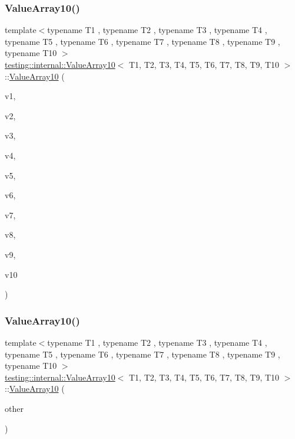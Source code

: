 \subsubsection{\texorpdfstring{ValueArray10()}{ValueArray10()}\hspace{0.1cm}{\footnotesize\ttfamily [1/2]}}
{\footnotesize\ttfamily template$<$typename T1 , typename T2 , typename T3 , typename T4 , typename T5 , typename T6 , typename T7 , typename T8 , typename T9 , typename T10 $>$ \\
\mbox{\hyperlink{classtesting_1_1internal_1_1_value_array10}{testing\+::internal\+::\+Value\+Array10}}$<$ T1, T2, T3, T4, T5, T6, T7, T8, T9, T10 $>$\+::\mbox{\hyperlink{classtesting_1_1internal_1_1_value_array10}{Value\+Array10}} (\begin{DoxyParamCaption}\item[{T1}]{v1,  }\item[{T2}]{v2,  }\item[{T3}]{v3,  }\item[{T4}]{v4,  }\item[{T5}]{v5,  }\item[{T6}]{v6,  }\item[{T7}]{v7,  }\item[{T8}]{v8,  }\item[{T9}]{v9,  }\item[{T10}]{v10 }\end{DoxyParamCaption})\hspace{0.3cm}{\ttfamily [inline]}}

\mbox{\label{classtesting_1_1internal_1_1_value_array10_a05195c20e50321e51b2502c71c5ec8fa}} 
\subsubsection{\texorpdfstring{ValueArray10()}{ValueArray10()}\hspace{0.1cm}{\footnotesize\ttfamily [2/2]}}
{\footnotesize\ttfamily template$<$typename T1 , typename T2 , typename T3 , typename T4 , typename T5 , typename T6 , typename T7 , typename T8 , typename T9 , typename T10 $>$ \\
\mbox{\hyperlink{classtesting_1_1internal_1_1_value_array10}{testing\+::internal\+::\+Value\+Array10}}$<$ T1, T2, T3, T4, T5, T6, T7, T8, T9, T10 $>$\+::\mbox{\hyperlink{classtesting_1_1internal_1_1_value_array10}{Value\+Array10}} (\begin{DoxyParamCaption}\item[{const \mbox{\hyperlink{classtesting_1_1internal_1_1_value_array10}{Value\+Array10}}$<$ T1, T2, T3, T4, T5, T6, T7, T8, T9, T10 $>$ \&}]{other }\end{DoxyParamCaption})\hspace{0.3cm}{\ttfamily [inline]}}



